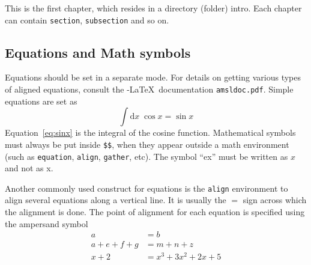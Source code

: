 This is the first chapter, which resides in a directory (folder)
intro. Each chapter can contain \verb|section|, \verb|subsection|
and so on.

\subsection{Equations and Math symbols}


Equations should be set in a separate mode.  For details on getting
various types of aligned equations, consult the \AmS-\LaTeX\
documentation \verb|amsldoc.pdf|. Simple equations are set as
\begin{equation}
\label{eq:sinux}
\int \mathrm{d}x \; \cos x =  \sin x
\end{equation}
Equation~\eqref{eq:sinx} is the integral of the cosine
function. Mathematical symbols must always be put inside \verb|$$|,
when they appear outside a math environment (such as \verb|equation|,
\verb|align|, \verb|gather|, etc).  The symbol ``ex'' must be written as
$x$ and not as x.  

Another commonly used construct for equations is the \verb|align|
environment to align several equations along a vertical line. It is
usually the $=$ sign across which the alignment is done.  The
point of alignment for each equation is specified using the ampersand symbol 
\begin{align}
a &= b  \\
a + e + f + g & = m + n + z \\
x + 2 & = x^{3} + 3 x^{2} + 2 x + 5
\end{align}

